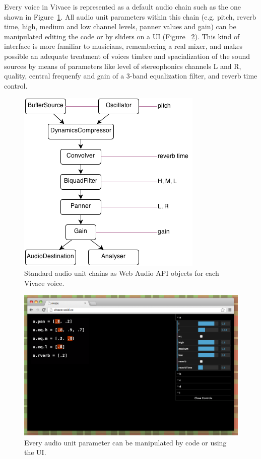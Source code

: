 \documentclass[letterpaper, 12pt]{article}
\begin{document}
Every voice in Vivace is represented as a default audio chain such
as the one shown
in Figure~\ref{fig:chain}. All audio unit parameters within this
chain (e.g. pitch, reverb time, high, medium and low channel levels,
panner values and gain) can be manipulated editing the code or by
sliders on a UI (Figure ~\ref{fig:ui}). This kind of interface is more
familiar to musicians, remembering a real mixer, and makes possible an
adequate treatment of voices timbre and spacialization of the
sound sources by means of parameters like level of stereophonics channels L
and R, quality, central frequenfy and gain of a 3-band equalization filter,
and reverb time control.

\begin{figure}[htpb]
  \begin{center}
    \includegraphics[scale=.5]{img/fig_chain.png}
    \caption{Standard audio unit chains as Web Audio API objects for
      each Vivace voice.}
    \label{fig:chain}
  \end{center}
\end{figure}

\begin{figure}[htpb]
  \begin{center}
    \includegraphics[scale=.3]{img/fig_ui.png}
    \caption{Every audio unit parameter can be manipulated by code or
      using the UI.}
    \label{fig:ui}
  \end{center}
\end{figure}
\end{document}
